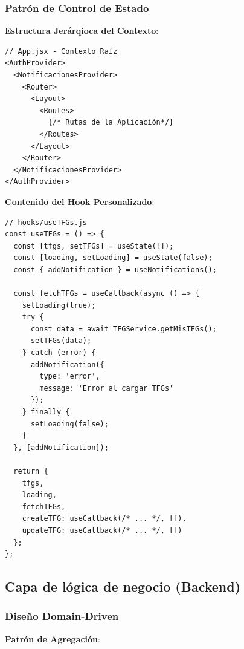 \documentclass[12pt,a4paper,oneside]{report}
\begin{document}
\subsubsection{Patrón de Control de Estado}\label{state-management-pattern}

\textbf{Estructura Jerárqioca del Contexto}:

\begin{lstlisting}
// App.jsx - Contexto Raíz
<AuthProvider>
  <NotificacionesProvider>
    <Router>
      <Layout>
        <Routes>
          {/* Rutas de la Aplicación*/}
        </Routes>
      </Layout>
    </Router>
  </NotificacionesProvider>
</AuthProvider>
\end{lstlisting}

\textbf{Contenido del Hook Personalizado}:

\begin{lstlisting}
// hooks/useTFGs.js
const useTFGs = () => {
  const [tfgs, setTFGs] = useState([]);
  const [loading, setLoading] = useState(false);
  const { addNotification } = useNotifications();
  
  const fetchTFGs = useCallback(async () => {
    setLoading(true);
    try {
      const data = await TFGService.getMisTFGs();
      setTFGs(data);
    } catch (error) {
      addNotification({
        type: 'error',
        message: 'Error al cargar TFGs'
      });
    } finally {
      setLoading(false);
    }
  }, [addNotification]);
  
  return {
    tfgs,
    loading,
    fetchTFGs,
    createTFG: useCallback(/* ... */, []),
    updateTFG: useCallback(/* ... */, [])
  };
};
\end{lstlisting}

\subsection{Capa de lógica de negocio
(Backend)}\label{capa-de-luxf3gica-de-negocio-backend}

\subsubsection{Diseño Domain-Driven}\label{domain-driven-design}

\textbf{Patrón de Agregación}:
\end{document}
